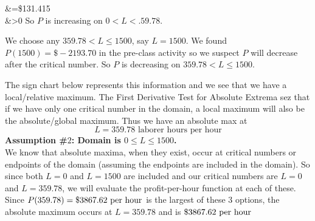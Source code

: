 \documentclass[11pt]{article}
\begin{document}
{{{{{&=\$131.415\\
&>0
}
So $P$ is increasing on $0<L<.59.78$.
\item We choose any $359.78<L\leq 1500$, say $L=1500$.  We found $P(1500)=\$-2193.70$ in the pre-class activity so we suspect $P$ will decrease after the critical number.
So $P$ is decreasing on $359.78<L\leq 1500$.
}
The sign chart below represents this information and we see that we have a local/relative maximum.
The First Derivative Test for Absolute Extrema sez that if we have only one critical number in the domain, a local maximum will also be the absolute/global maximum. Thus we have an absolute max at $$L=359.78 \text{ laborer hours per hour}$$
{\bf Assumption \#$2$: Domain is $0\leq L\leq 1500$.}\\
We know that absolute maxima, when they exist, occur at critical numbers or endpoints of the domain (assuming the endpoints are included in the domain).  So since both $L=0$ and $L=1500$ are included and our critical numbers are $L=0$ and $L=359.78$, we will evaluate the profit-per-hour function at each of these.
Since $\displaystyle P(359.78)=\$3867.62 \text{ per hour}$ is the largest  of these $3$ options, the absolute maximum occurs at $L=359.78$ and is $\displaystyle \$3867.62 \text{ per hour}$ \\\\

}}}
\end{document}
